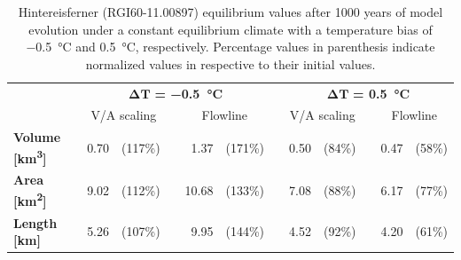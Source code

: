 \begin{table}[htp]
  \centering
  \caption{Hintereisferner (RGI60-11.00897) equilibrium values after 1000 years of model evolution under a constant equilibrium climate with a temperature bias of \SI{-0.5}{\celsius} and \SI{+0.5}{\celsius}, respectively. Percentage values in parenthesis indicate normalized values in respective to their initial values.}
  \label{tab:hintereisferner_equilibrium_values}
  \begin{tabular}{@{}lrlcrlcrlcrl@{}}
    \toprule
    {} & \multicolumn{5}{c}{$\bm{\Delta T}$\textbf{ = \SI{-0.5}{\celsius}}} & \phantom{a} & \multicolumn{5}{c}{$\bm{\Delta T}$\textbf{ = \SI{+0.5}{\celsius}}} \\
    \cmidrule{2-6} \cmidrule{8-12}

    {} & \multicolumn{2}{c}{V/A scaling} & \phantom {} & \multicolumn{2}{c}{Flowline} & \phantom{a} & \multicolumn{2}{c}{V/A scaling} & \phantom {} & \multicolumn{2}{c}{Flowline} \\
    \midrule
    \textbf{Volume [\si{\cubic\kilo\meter}]} &  0.70 & (117\%) & \phantom {} &  1.37 & (171\%) & \phantom{a} &  0.50 & (84\%) & \phantom {} &  0.47 & (58\%) \\
    \textbf{Area [\si{\square\kilo\meter}]} &  9.02 & (112\%) & \phantom {} &  10.68 & (133\%) & \phantom{a} &  7.08 & (88\%) & \phantom {} &  6.17 & (77\%) \\
    \textbf{Length [\si{\kilo\meter}]} &  5.26 & (107\%) & \phantom {} &  9.95 & (144\%) & \phantom{a} &  4.52 & (92\%) & \phantom {} &  4.20 & (61\%) \\
    \bottomrule
  \end{tabular}
\end{table}


